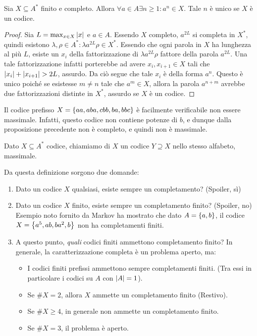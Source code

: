 \begin{proposition}
  Sia \(X \subseteq A^*\) finito e completo. Allora \(\forall a \in A \exists n \geq 1 : a^n \in X\). Tale \(n\) è unico se \(X\) è un codice.
\end{proposition}
\begin{proof}
  Sia \(L = \max_{x \in X}\left|x\right|\) e \(a \in A\). Essendo \(X\) completo, \(a^{2L}\) si completa in \(X^*\), quindi esistono \(\lambda, \rho \in A^*: \lambda a^{2L} \rho \in X^*\).
  Essendo che ogni parola in \(X\) ha lunghezza al più \(L\), esiste un \(x_i\) della fattorizzazione di \(\lambda a^{2L} \rho\) fattore della parola \(a^{2L}\).
  Una tale fattorizzazione infatti porterebbe ad avere \(x_i,x_{i+1} \in X\) tali che \(\left|x_i\right|+\left|x_{i+1}\right| > 2L\), assurdo.
  Da ciò segue che tale \(x_i\) è della forma \(a^n\). Questo è unico poiché se esistesse \(m\neq n\) tale che \(a^m \in X\), allora la parola \(a^{n+m}\) avrebbe due fattorizzazioni distinte in \(X^*\), assurdo se \(X\) è un codice.
\end{proof}

\begin{example}
  Il codice prefisso \(X = \set{aa,aba,cbb,ba,bbc}\) è facilmente verificabile non essere massimale. Infatti, questo codice non contiene potenze di \(b\), e dunque dalla proposizione precedente non è completo, e quindi non è massimale.
\end{example}

\begin{definition}
  Dato \(X \subseteq A^*\) codice, chiamiamo  di \(X\) un codice \(Y \supseteq X\) nello stesso alfabeto, massimale.
\end{definition}

Da questa definizione sorgono due domande:
\begin{enumerate}
  \item Dato un codice \(X\) qualsiasi, esiste sempre un completamento? (Spoiler, sì)
  \item Dato un codice \(X\) finito, esiste sempre un completamento finito? (Spoiler, no)
    Esempio noto fornito da Markov ha mostrato che dato \(A = \set{a,b}\), il codice \(X = \set{a^5,ab,ba^2,b}\) non ha completamenti finiti.
  \item A questo punto, \emph{quali} codici finiti ammettono completamento finito?
    In generale, la caratterizzazione completa è un problema aperto, ma:
    \begin{itemize}
      \item I codici finiti prefissi ammettono sempre completamenti finiti. (Tra essi in particolare i codici su \(A\) con \(\left|A\right| = 1\)).
      \item Se \(\#X = 2\), allora \(X\) ammette un completamento finito (Restivo).
      \item Se \(\#X \geq 4\), in generale non ammette un completamento finito.
      \item Se \(\#X = 3\), il problema è aperto.
    \end{itemize}
\end{enumerate}

